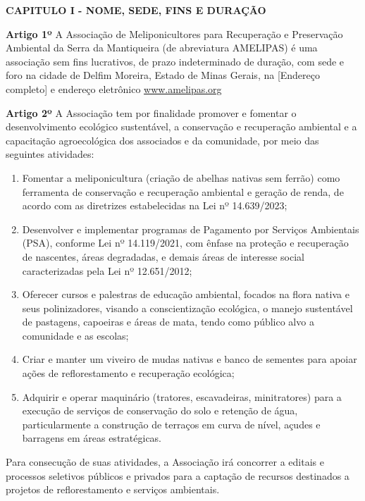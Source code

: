 \documentclass[12pt]{article}
\newcommand{\capitulo}[1]{\vspace{1.0em}\begin{center}\fontseries{b}\selectfont\textbf{\MakeUppercase{#1}}\end{center}}
\newcommand{\artigo}[1]{\vspace{1.0em}\noindent\textbf{#1}\hspace{0.75em}}
\newcommand{\paragrafo}[1]{\vspace{1.0em}\noindent{#1}\hspace{0.75em}}
\newcommand{\titulo}[1]{\begin{center}\fontsize{18}{22}\fontseries{b}\selectfont{#1\\[1.0em]}\end{center}}
\newcommand{\subtitulo}[1]{\begin{center}\fontsize{16}{17}\fontseries{m}\selectfont{#1\\[0.5em]}\end{center}}
\newcommand{\subsubtitulo}[1]{\begin{center}\fontsize{10}{12}\fontseries{m}\selectfont{#1\\[2.0em]}\end{center}}
\begin{document}
\titulo{ESTATUTO SOCIAL}
\subtitulo{Associação de Meliponicultores para Recuperação \\e Preservação Ambiental da Serra da Mantiqueira}\subsubtitulo{CNPJ 12.3456.789/0001-00}


\capitulo{Capitulo I - Nome, Sede, Fins e Duração}

\artigo{Artigo 1º} A Associação de Meliponicultores para Recuperação e Preservação Ambiental da Serra da Mantiqueira (de abreviatura AMELIPAS) é uma associação sem fins lucrativos, de prazo indeterminado de duração, com sede e foro na cidade de Delfim Moreira, Estado de Minas Gerais, na [Endereço completo] e endereço eletrônico \url{www.amelipas.org}

\artigo{Artigo 2º} A Associação tem por finalidade promover e fomentar o desenvolvimento ecológico sustentável, a conservação e recuperação ambiental e a capacitação agroecológica dos associados e da comunidade, por meio das seguintes atividades:
\begin{enumerate}[label=\alph*)]
  \item Fomentar a meliponicultura (criação de abelhas nativas sem ferrão) como ferramenta de conservação e recuperação ambiental e geração de renda, de acordo com as diretrizes estabelecidas na Lei nº 14.639/2023;
  \item Desenvolver e implementar programas de Pagamento por Serviços Ambientais (PSA), conforme Lei nº 14.119/2021, com ênfase na proteção e recuperação de nascentes, áreas degradadas, e demais áreas de interesse social caracterizadas pela Lei nº 12.651/2012;
  \item Oferecer cursos e palestras de educação ambiental, focados na flora nativa e seus polinizadores, visando a conscientização ecológica, o manejo sustentável de pastagens, capoeiras e áreas de mata, tendo como público alvo a comunidade e as escolas;
  \item Criar e manter um viveiro de mudas nativas e banco de sementes para apoiar ações de reflorestamento e recuperação ecológica;
  \item Adquirir e operar maquinário (tratores, escavadeiras, minitratores) para a execução de serviços de conservação do solo e retenção de água, particularmente a construção de terraços em curva de nível, açudes e barragens em áreas estratégicas.
\end{enumerate}

\paragrafo{§ 1º} Para consecução de suas atividades, a Associação irá concorrer a editais e processos seletivos públicos e privados para a captação de recursos destinados a projetos de reflorestamento e serviços ambientais.
\end{document}
